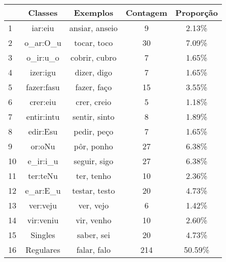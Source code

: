\begin{table}[H]
\begin{center}
\begin{tabular}{|l|c|c|c|c|}
\toprule
& Classes & Exemplos & Contagem & Proporção\\
\midrule
1 & iar:eiu & ansiar, anseio & 9 & 2.13\%\\
2 & o\_ar:O\_u & tocar, toco & 30 & 7.09\%\\
3 & o\_ir:u\_o & cobrir, cubro & 7 & 1.65\%\\
4 & izer:igu & dizer, digo & 7 & 1.65\%\\
5 & fazer:fasu & fazer, faço & 15 & 3.55\%\\
6 & crer:eiu & crer, creio & 5 & 1.18\%\\
7 & entir:intu & sentir, sinto & 8 & 1.89\% \\
8 & edir:Esu & pedir, peço & 7 & 1.65\%\\
9 & or:oNu & pôr, ponho & 27 & 6.38\%\\
10 & e\_ir:i\_u & seguir, sigo & 27 & 6.38\%\\
11 & ter:teNu & ter, tenho & 10 & 2.36\%\\
12 & e\_ar:E\_u & testar, testo & 20 & 4.73\%\\
13 & ver:veju & ver, vejo & 6 & 1.42\%\\
14 & vir:veniu & vir, venho & 10 & 2.60\%\\
15 & Singles & saber, sei & 20 & 4.73\%\\
16 & Regulares & falar, falo & 214 & 50.59\%\\
\bottomrule
\end{tabular}
\end{center}
\label{tab:classes}
\end{table}




